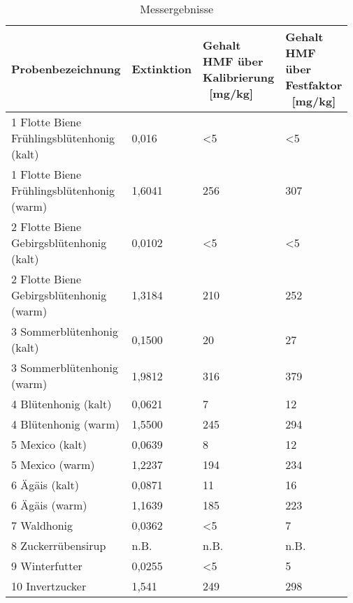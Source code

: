 \begin{table}[htbp]
	\centering
		\begin{tabular}{p{0.30\linewidth}|p{0.17\linewidth}|p{0.25\linewidth}|p{0.25\linewidth}} 
			Probenbezeichnung & Extinktion & Gehalt HMF über Kalibrierung \ [mg/kg] &  Gehalt HMF über Festfaktor \ [mg/kg]\\
			\hline
			1 Flotte Biene Frühlingsblütenhonig (kalt) & 0,016 & <5 & <5\\
			\hline
			1 Flotte Biene Frühlingsblütenhonig (warm) & 1,6041 & 256 & 307\\
			\hline
			2 Flotte Biene Gebirgsblütenhonig (kalt) & 0,0102 & <5 & <5\\
			\hline
			2 Flotte Biene Gebirgsblütenhonig (warm) & 1,3184 & 210 & 252\\
			\hline
			3 Sommerblütenhonig (kalt) & 0,1500 & 20 & 27\\
			\hline
			3 Sommerblütenhonig (warm) & 1,9812 & 316 & 379\\
			\hline
			4 Blütenhonig (kalt) & 0,0621 & 7 & 12\\
			\hline
			4 Blütenhonig (warm) & 1,5500 & 245 & 294\\
			\hline
			5 Mexico (kalt) & 0,0639 & 8 & 12\\
			\hline
			5 Mexico (warm) & 1,2237 & 194 & 234\\
			\hline
			6 Ägäis (kalt) & 0,0871 & 11 & 16\\
			\hline
			6 Ägäis (warm) & 1,1639 & 185 & 223\\
			\hline
			7 Waldhonig & 0,0362 & <5 & 7\\
			\hline
			8 Zuckerrübensirup & n.B. & n.B. & n.B.\\
			\hline
			9 Winterfutter & 0,0255 & <5 & 5\\
			\hline
			10 Invertzucker & 1,541 & 249 & 298\\

		\end{tabular}
	\caption{Messergebnisse}
	\label{tab:Messergebnisse}
\end{table}

